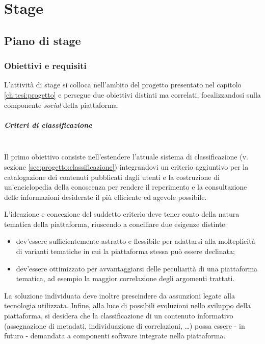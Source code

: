 \chapter{Stage}
\label{ch:tesi:stage}

\section{Piano di stage}
\label{sec:tesi:stage:piano}

\subsection{Obiettivi e requisiti}
\label{sec:tesi:stage:piano:obiettivi}
L'attività di stage si colloca nell'ambito del progetto presentato nel capitolo \ref{ch:tesi:progetto} e persegue due obiettivi distinti ma correlati, focalizzandosi sulla componente \textit{social} della piattaforma.

\paragraph{Criteri di classificazione} \hfill \\
Il primo obiettivo consiste nell'estendere l'attuale sistema di classificazione (v. sezione \ref{sec:progetto:classificazione}) integrandovi un criterio aggiuntivo per la catalogazione dei contenuti pubblicati dagli utenti e la costruzione di un'enciclopedia della conoscenza per rendere il reperimento e la consultazione delle informazioni desiderate il più efficiente ed agevole possibile.

L'ideazione e concezione del suddetto criterio deve tener conto della natura tematica della piattaforma, riuscendo a conciliare due esigenze distinte:
\begin{itemize}
\item dev'essere sufficientemente astratto e flessibile per adattarsi alla molteplicità di varianti tematiche in cui la piattaforma stessa può essere declinata;
\item dev'essere ottimizzato per avvantaggiarsi delle peculiarità di una piattaforma tematica, ad esempio la maggior correlazione degli argomenti trattati.
\end{itemize}

La soluzione individuata deve inoltre prescindere da assunzioni legate alla tecnologia utilizzata. Infine, alla luce di possibili evoluzioni nello sviluppo della piattaforma, si desidera che la classificazione di un contenuto informativo (assegnazione di metadati, individuazione di correlazioni, \ldots) possa essere - in futuro - demandata a componenti software integrate nella piattaforma.

